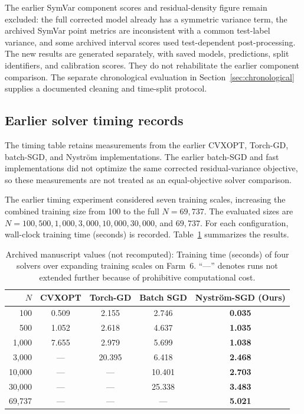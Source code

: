 {\color{blue}The earlier SymVar component scores and residual-density figure remain excluded: the full corrected model already has a symmetric variance term, the archived SymVar point metrics are inconsistent with a common test-label variance, and some archived interval scores used test-dependent post-processing. The new results are generated separately, with saved models, predictions, split identifiers, and calibration scores. They do not rehabilitate the earlier component comparison. The separate chronological evaluation in Section~\ref{sec:chronological} supplies a documented cleaning and time-split protocol.}

\FloatBarrier


\subsection{Earlier solver timing records}\label{sec:exp5}

{\color{blue}The timing table retains measurements from the earlier CVXOPT, Torch-GD, batch-SGD, and Nystr\"{o}m implementations. The earlier batch-SGD and fast implementations did not optimize the same corrected residual-variance objective, so these measurements are not treated as an equal-objective solver comparison.}


The earlier timing experiment considered seven training scales, increasing the combined training size from 100 to the full $N=69{,}737$. The evaluated sizes are $N=100, 500, 1{,}000, 3{,}000, 10{,}000, 30{,}000$, and $69{,}737$.
For each configuration, wall-clock training time (seconds) is recorded. Table~\ref{tab:scalability_results} summarizes the results.

\begin{table}[ht]
\centering
\caption{{\color{blue}Archived manuscript values (not recomputed): }Training time (seconds) of four solvers over expanding training scales on Farm~6. ``---'' denotes runs not extended further because of prohibitive computational cost.}
{\small
\setlength{\tabcolsep}{2.6mm}
\begin{tabular}{rcccc}
\toprule
$N$ & CVXOPT & Torch-GD & Batch SGD & Nystr\"{o}m-SGD (Ours) \\
\midrule
100      & 0.509 & 2.155 & 2.746 & \textbf{0.035} \\
500      & 1.052 & 2.618 & 4.637 & \textbf{1.035} \\
1{,}000  & 7.655 & 2.979 & 5.699 & \textbf{1.038} \\
3{,}000  & --- & 20.395 & 6.418 & \textbf{2.468} \\
10{,}000 & --- & --- & 10.401 & \textbf{2.703} \\
30{,}000 & --- & --- & 25.338 & \textbf{3.483} \\
69{,}737 & --- & --- & --- & \textbf{5.021} \\
\bottomrule
\end{tabular}
}
\label{tab:scalability_results}
\end{table}

